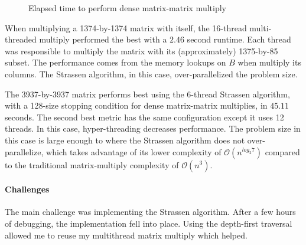 \documentclass{article}
\begin{document}
\begin{figure}[h]      
	\centering 
    \hspace{10px}
    \hspace{10px}
    \caption{Elapsed time to perform dense matrix-matrix multiply}
    \label{materialflowChart}
\end{figure}

When multiplying a 1374-by-1374 matrix with itself, the 16-thread multi-threaded multiply performed the best with a $2.46$ second runtime. Each thread was responsible to multiply the matrix with its (approximately) 1375-by-85 subset.  The performance comes from the memory lookups on $B$ when multiply its columns. The Strassen algorithm, in this case, over-parallelized the problem size.
\linebreak

The 3937-by-3937 matrix performs best using the 6-thread Strassen algorithm, with a 128-size stopping condition for dense matrix-matrix multiplies, in $45.11$ seconds. The second best metric has the same configuration except it uses 12 threads. In this case, hyper-threading decreases performance. The problem size in this case is large enough to where the Strassen algorithm does not over-parallelize, which takes advantage of its lower complexity of $\mathcal{O}(n^{log_{2}{7}})$ compared to the traditional matrix-multiply complexity of $\mathcal{O}(n^3)$.

\paragraph{Challenges}
The main challenge was implementing the Strassen algorithm. After a few hours of debugging, the implementation fell into place. Using the depth-first traversal allowed me to reuse my multithread matrix multiply which helped.
\end{document}
